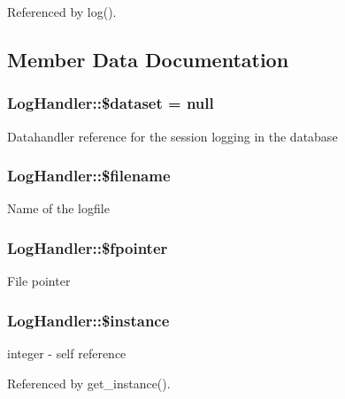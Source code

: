 Referenced by log().



\subsection{Member Data Documentation}
\subsubsection[{\$dataset}]{\setlength{\rightskip}{0pt plus 5cm}LogHandler::\$dataset = null}\label{classLogHandler_aa133900b467a9224e64fcef83f1f9cb8}
Datahandler reference for the session logging in the database 
\subsubsection[{\$filename}]{\setlength{\rightskip}{0pt plus 5cm}LogHandler::\$filename}\label{classLogHandler_ab51c12bcd654093b9d0153ab38ebad8c}
Name of the logfile 
\subsubsection[{\$fpointer}]{\setlength{\rightskip}{0pt plus 5cm}LogHandler::\$fpointer}\label{classLogHandler_ad65c8954bda40d8a33828f0a0a2cbf5b}
File pointer 
\subsubsection[{\$instance}]{\setlength{\rightskip}{0pt plus 5cm}LogHandler::\$instance}\label{classLogHandler_a1907cf33534c0b1100fa593c12bcfb6e}
integer -\/ self reference 

Referenced by get\_\-instance().

